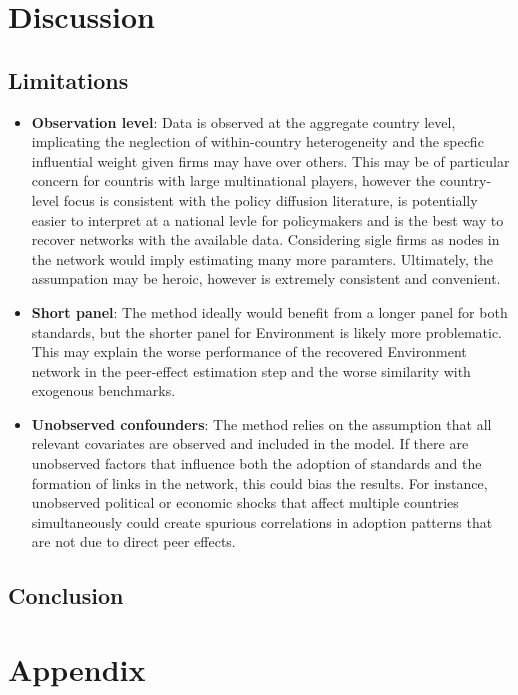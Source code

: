\documentclass[12pt,a4paper]{article}
\begin{document}
\section{Discussion}

\subsection{Limitations}
\begin{itemize}
    \item \textbf{Observation level}: Data is observed at the aggregate country level, implicating the neglection of within-country heterogeneity and the specfic influential weight given firms may have over others. This may be of particular concern for countris with large multinational players, however the country-level focus is consistent with the policy diffusion literature, is potentially easier to interpret at a national levle for policymakers and is the best way to recover networks with the available data. Considering sigle firms as nodes in the network would imply estimating many more paramters. Ultimately, the assumpation may be heroic, however is extremely consistent and convenient.
    \item \textbf{Short panel}: The method ideally would benefit from a longer panel for both standards, but the shorter panel for Environment is likely more problematic. This may explain the worse performance of the recovered Environment network in the peer-effect estimation step and the worse similarity with exogenous benchmarks.
    \item \textbf{Unobserved confounders}: The method relies on the assumption that all relevant covariates are observed and included in the model. If there are unobserved factors that influence both the adoption of standards and the formation of links in the network, this could bias the results. For instance, unobserved political or economic shocks that affect multiple countries simultaneously could create spurious correlations in adoption patterns that are not due to direct peer effects.
\end{itemize}

\subsection{Conclusion}


\clearpage

\appendix
\section{Appendix}
\renewcommand{\thefigure}{A\arabic{figure}}
\renewcommand{\thetable}{A\arabic{table}}
\setcounter{figure}{0}
\setcounter{table}{0}
\end{document}
